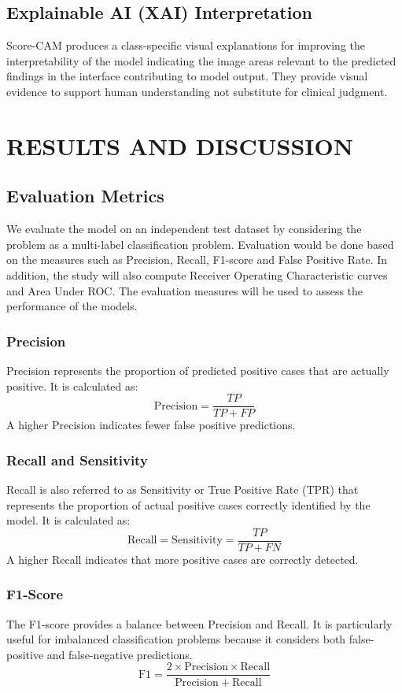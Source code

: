 \documentclass[conference]{IEEEtran}
\begin{document}
\subsection{\textbf{Explainable AI (XAI) Interpretation}}
Score-CAM produces a class-specific visual explanations for improving the interpretability of the model indicating the image areas relevant to the predicted findings in the interface contributing to model output. They provide visual evidence to support human understanding not substitute for clinical judgment.
\section{RESULTS AND DISCUSSION}
\subsection{Evaluation Metrics}
We evaluate the model on an independent test dataset by considering the problem as a multi-label classification problem. Evaluation would be done based on the measures such as Precision, Recall, F1-score and False Positive Rate. In addition, the study will also compute Receiver Operating Characteristic curves and Area Under ROC. The evaluation measures will be used to assess the performance of the models.
\subsubsection{Precision}
Precision represents the proportion of predicted positive cases that are actually positive. It is calculated as:
\begin{equation}
\mathrm{Precision}
=
\frac{TP}{TP+FP}
\end{equation}
A higher Precision indicates fewer false positive predictions.
\subsubsection{Recall and Sensitivity}
Recall is also referred to as Sensitivity or True Positive Rate (TPR) that represents the proportion of actual positive cases correctly identified by the model. It is calculated as:
\begin{equation}
\mathrm{Recall}
=
\mathrm{Sensitivity}
=
\frac{TP}{TP+FN}
\end{equation}
A higher Recall indicates that more positive cases are correctly detected.
\subsubsection{F1-Score}
The F1-score provides a balance between Precision and Recall. It is particularly useful for imbalanced classification problems because it considers both false-positive and false-negative predictions.
\begin{equation}
\mathrm{F1}
=
\frac{2\times\mathrm{Precision}\times\mathrm{Recall}}
{\mathrm{Precision}+\mathrm{Recall}}
\end{equation}
\end{document}
